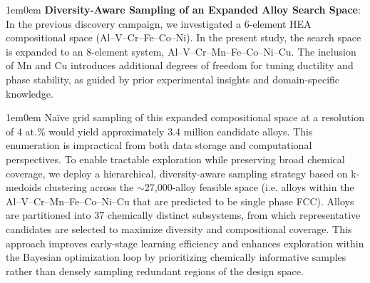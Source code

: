 \begin{adjustwidth}{1em}{0em}
\textbf{Diversity-Aware Sampling of an Expanded Alloy Search Space}: In the previous discovery campaign, we investigated a  6-element HEA compositional space (Al–V–Cr–Fe–Co–Ni). In the present study, the search space is expanded to an 8-element system, Al–V–Cr–Mn–Fe–Co–Ni–Cu. The inclusion of Mn and Cu introduces additional degrees of freedom for tuning ductility and phase stability, as guided by prior experimental insights and domain-specific knowledge.
\end{adjustwidth}

\begin{adjustwidth}{1em}{0em}
Naïve grid sampling of this expanded compositional space at a resolution of 4 at.\% would yield approximately 3.4 million candidate alloys. This enumeration is impractical from both data storage and computational perspectives. To enable tractable exploration while preserving broad chemical coverage, we deploy a hierarchical, diversity-aware sampling strategy based on k-medoids clustering across the $\sim$27{,}000-alloy feasible space (i.e. alloys within the Al–V–Cr–Mn–Fe–Co–Ni–Cu that are predicted to be single phase FCC). Alloys are partitioned into 37 chemically distinct subsystems, from which representative candidates are selected to maximize diversity and compositional coverage. This approach improves early-stage learning efficiency and enhances exploration within the Bayesian optimization loop by prioritizing chemically informative samples rather than densely sampling redundant regions of the design space.
\end{adjustwidth}




